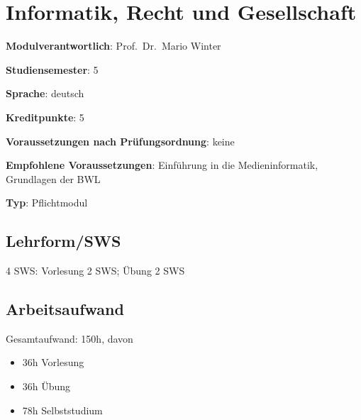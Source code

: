 \chapter{Informatik, Recht und
Gesellschaft\label{/mi-2017/modulbeschreibungen-bachelor/BA_MUG}}\label{informatik-recht-und-gesellschaftpathlabelmi-2017modulbeschreibungen-bachelorbaux5fmug}

\begin{modulHead}
\textbf{Modulverantwortlich}: Prof.~Dr.~Mario
Winter
\end{modulHead}
\begin{modulHead}
\textbf{Studiensemester}:
5
\end{modulHead}
\begin{modulHead}
\textbf{Sprache}:
deutsch
\end{modulHead}
\begin{modulHead}
\textbf{Kreditpunkte}:
5
\end{modulHead}
\begin{modulHead}
\textbf{Voraussetzungen nach
Prüfungsordnung}:
keine
\end{modulHead}
\begin{modulHead}
\textbf{Empfohlene
Voraussetzungen}: Einführung in die Medieninformatik, Grundlagen der
BWL
\end{modulHead}
\begin{modulHead}
\textbf{Typ}:
Pflichtmodul
\end{modulHead}


\section*{Lehrform/SWS\label{/mi-2017/modulbeschreibungen-bachelor/BA_MUG}}\label{lehrformswspathlabelmi-2017modulbeschreibungen-bachelorbaux5fmug}

4 SWS: Vorlesung 2 SWS; Übung 2 SWS

\section*{Arbeitsaufwand\label{/mi-2017/modulbeschreibungen-bachelor/BA_MUG}}\label{arbeitsaufwandpathlabelmi-2017modulbeschreibungen-bachelorbaux5fmug}

Gesamtaufwand: 150h, davon

\begin{itemize}
\tightlist
\item
  36h Vorlesung
\item
  36h Übung
\item
  78h Selbststudium
\end{itemize}

